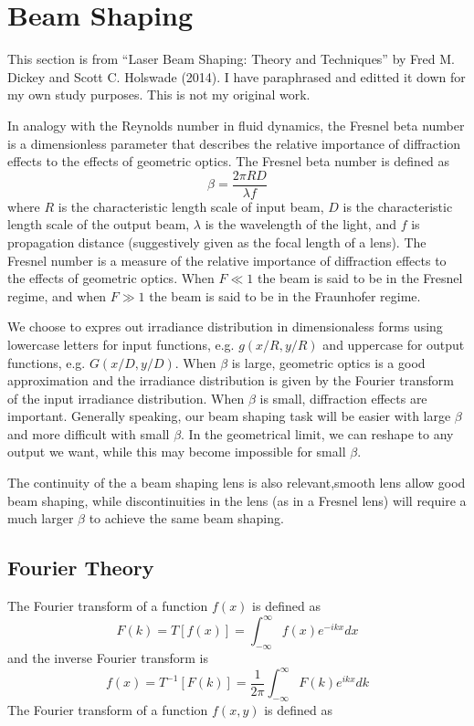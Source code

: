 \documentclass[../../main.tex]{subfiles} %
\begin{document}
\section{Beam Shaping}
This section is from ``Laser Beam Shaping: Theory and Techniques'' by Fred M. Dickey and Scott C. Holswade (2014). I have paraphrased and editted it down for my own study purposes. This is not my original work.

In analogy with the Reynolds number in fluid dynamics, the Fresnel beta number is a dimensionless parameter that describes the relative importance of diffraction effects to the effects of geometric optics. The Fresnel beta number is defined as
\begin{equation}
    \beta=\frac{2\pi RD}{\lambda f}
\end{equation}
where $R$ is the characteristic length scale of input beam, $D$ is the characteristic length scale of the output beam, $\lambda$ is the wavelength of the light, and $f$ is propagation distance (suggestively given as the focal length of a lens). The Fresnel number is a measure of the relative importance of diffraction effects to the effects of geometric optics. When $F\ll 1$ the beam is said to be in the Fresnel regime, and when $F\gg 1$ the beam is said to be in the Fraunhofer regime.

We choose to expres out irradiance distribution in dimensionaless forms using lowercase letters for input functions, e.g. $g(x/R,y/R)$ and uppercase for output functions, e.g. $G(x/D,y/D)$. When $\beta$ is large, geometric optics is a good approximation and the irradiance distribution is given by the Fourier transform of the input irradiance distribution. When $\beta$ is small, diffraction effects are important. Generally speaking, our beam shaping task will be easier with large $\beta$ and more difficult with small $\beta$. In the geometrical limit, we can reshape to any output we want, while this may become impossible for small $\beta$. 

The continuity of the a beam shaping lens is also relevant,smooth lens allow good beam shaping, while discontinuities in the lens (as in a Fresnel lens) will require a much larger $\beta$ to achieve the same beam shaping.

\subsection{Fourier Theory}
The Fourier transform of a function $f(x)$ is defined as
\begin{equation}
    F(k)=T[f(x)]=\int_{-\infty}^\infty f(x)e^{-ikx}dx
\end{equation}
and the inverse Fourier transform is
\begin{equation}
    f(x)=T^{-1}[F(k)]=\frac{1}{2\pi}\int_{-\infty}^\infty F(k)e^{ikx}dk
\end{equation}
The Fourier transform of a function $f(x,y)$ is defined as
\end{document}
